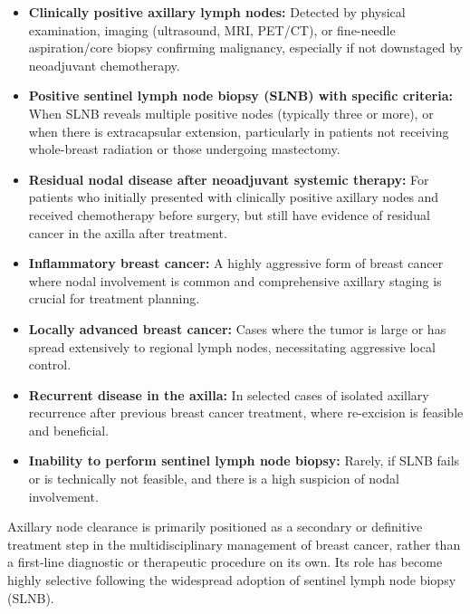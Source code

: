 \begin{itemize}
  \item \textbf{Clinically positive axillary lymph nodes:} Detected by physical examination, imaging (ultrasound, MRI, PET/CT), or fine-needle aspiration/core biopsy confirming malignancy, especially if not downstaged by neoadjuvant chemotherapy.
  \item \textbf{Positive sentinel lymph node biopsy (SLNB) with specific criteria:} When SLNB reveals multiple positive nodes (typically three or more), or when there is extracapsular extension, particularly in patients not receiving whole-breast radiation or those undergoing mastectomy.
  \item \textbf{Residual nodal disease after neoadjuvant systemic therapy:} For patients who initially presented with clinically positive axillary nodes and received chemotherapy before surgery, but still have evidence of residual cancer in the axilla after treatment.
  \item \textbf{Inflammatory breast cancer:} A highly aggressive form of breast cancer where nodal involvement is common and comprehensive axillary staging is crucial for treatment planning.
  \item \textbf{Locally advanced breast cancer:} Cases where the tumor is large or has spread extensively to regional lymph nodes, necessitating aggressive local control.
  \item \textbf{Recurrent disease in the axilla:} In selected cases of isolated axillary recurrence after previous breast cancer treatment, where re-excision is feasible and beneficial.
  \item \textbf{Inability to perform sentinel lymph node biopsy:} Rarely, if SLNB fails or is technically not feasible, and there is a high suspicion of nodal involvement.
\end{itemize}

Axillary node clearance is primarily positioned as a secondary or definitive treatment step in the multidisciplinary management of breast cancer, rather than a first-line diagnostic or therapeutic procedure on its own. Its role has become highly selective following the widespread adoption of sentinel lymph node biopsy (SLNB).

